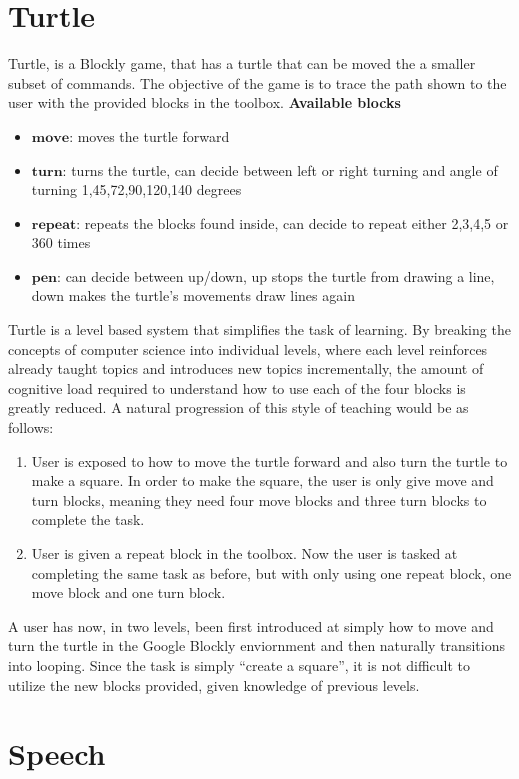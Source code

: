 \documentclass[]{article}
\begin{document}
\section{Turtle}
Turtle, is a Blockly game, that has a turtle that can be moved the a smaller
subset of commands. The objective of the game is to trace the path shown to the
user with the provided blocks in the toolbox.
\textbf{Available blocks}
\begin{itemize}
  \item $\textbf{move}$: moves the turtle forward
  \item $\textbf{turn}$: turns the turtle, can decide between left or right turning and angle of turning  1,45,72,90,120,140 degrees
  \item $\textbf{repeat}$: repeats the blocks found inside, can decide to repeat either 2,3,4,5 or 360 times
  \item $\textbf{pen}$: can decide between up/down, up stops the turtle from drawing a line, down makes the turtle's movements draw lines again
\end{itemize}
Turtle is a level based system that simplifies the task of learning. By breaking the concepts of computer science into individual
levels, where each level reinforces already taught topics and introduces new topics incrementally, the amount of cognitive load
required to understand how to use each of the four blocks is greatly reduced. A natural progression of this style of teaching would be as follows:
\begin{enumerate}
  \item User is exposed to how to move the turtle forward and also turn the turtle to make a square. In order to make the square, the user
    is only give move and turn blocks, meaning they need four move blocks and three turn blocks to complete the task.
  \item User is given a repeat block in the toolbox. Now the user is tasked at completing the same task as before, but with only using one repeat
    block, one move block and one turn block.
\end{enumerate}
A user has now, in two levels, been first introduced at simply how to move and turn the turtle in the Google Blockly enviornment and then
naturally transitions into looping. Since the task is simply ``create a square'', it is not difficult to utilize the new blocks provided,
given knowledge of previous levels.
\section{Speech}
\end{document}
